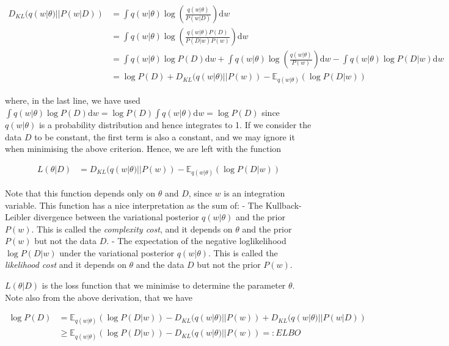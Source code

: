 \documentclass[11pt]{article}
\begin{document}
\[
\begin{align}
D_{KL} (q(w | \theta) || P(w | D)) &= \int q(w | \theta) \log \left( \frac{q(w | \theta)}{P(w | D)} \right) \text{d} w \\
&= \int q(w | \theta) \log \left( \frac{q(w | \theta) P(D)}{P(D | w) P(w)} \right) \text{d} w \\
&= \int q(w | \theta) \log P(D) \text{d} w + \int q(w | \theta) \log \left( \frac{q(w | \theta)}{P(w)} \right) \text{d} w - \int q(w | \theta) \log P(D | w) \text{d} w \\
&= \log P(D) + D_{KL} ( q(w | \theta) || P(w) ) - \mathbb{E}_{q(w | \theta)}(\log P(D | w))
\end{align}
\]

where, in the last line, we have used
\(\int q(w | \theta) \log P(D) \text{d}w = \log P(D) \int q(w | \theta) \text{d} w = \log P(D)\)
since \(q(w | \theta)\) is a probability distribution and hence
integrates to 1. If we consider the data \(D\) to be constant, the first
term is also a constant, and we may ignore it when minimising the above
criterion. Hence, we are left with the function

\[
\begin{align}
L(\theta | D) &= D_{KL} ( q(w | \theta) || P(w) ) - \mathbb{E}_{q(w | \theta)}(\log P(D | w))
\end{align}
\]

Note that this function depends only on \(\theta\) and \(D\), since
\(w\) is an integration variable. This function has a nice
interpretation as the sum of: - The Kullback-Leibler divergence between
the variational posterior \(q(w | \theta)\) and the prior \(P(w)\). This
is called the \emph{complexity cost}, and it depends on \(\theta\) and
the prior \(P(w)\) but not the data \(D\). - The expectation of the
negative loglikelihood \(\log P(D | w)\) under the variational posterior
\(q(w | \theta)\). This is called the \emph{likelihood cost} and it
depends on \(\theta\) and the data \(D\) but not the prior \(P(w)\).

\(L(\theta | D)\) is the loss function that we minimise to determine the
parameter \(\theta\). Note also from the above derivation, that we have

\[
\begin{align}
\log P(D) &= \mathbb{E}_{q(w | \theta)}(\log P(D | w)) - D_{KL} ( q(w | \theta) || P(w) ) + D_{KL} (q(w | \theta) || P(w | D))\\
&\ge \mathbb{E}_{q(w | \theta)}(\log P(D | w)) - D_{KL} ( q(w | \theta) || P(w) ) =: ELBO
\end{align}
\]
\end{document}
